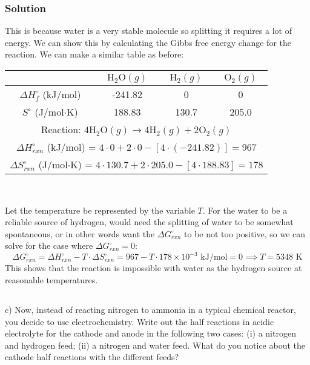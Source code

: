 \documentclass[12pt]{article}
\begin{document}
\subsubsection{Solution}
This is because water is a very stable molecule so splitting it requires a lot of energy. We can show this by calculating the Gibbs free energy change for the reaction.
We can make a similar table as before:
\begin{center}
\begin{tabular}{|c|c|c|c|}
\hline
    & $\mathrm{H_{2}O}(g)$ & $\mathrm{H_{2}}(g)$ & $\mathrm{O_{2}}(g)$ \\
\hline
$\Delta H_{f}^{\circ}$ (kJ/mol) & -241.82 & 0 & 0 \\
\hline
$S^{\circ}$ (J/mol$\cdot$K) & 188.83 & 130.7 & 205.0 \\
\hline
\multicolumn{4}{|c|}{Reaction: $4 \mathrm{H_{2}O}(g) \rightarrow 4 \mathrm{H_{2}}(g)+2\mathrm{O_{2}}(g)$} \\
\hline
\multicolumn{4}{|c|}{$\Delta H_{rxn}^{\circ}$ (kJ/mol) = $4 \cdot 0 + 2 \cdot 0 - [4 \cdot (-241.82)] = 967 $} \\
\hline
\multicolumn{4}{|c|}{$\Delta S_{rxn}^{\circ}$ (J/mol$\cdot$K) = $4 \cdot 130.7 + 2 \cdot 205.0 - [4 \cdot 188.83] = 178$} \\
\hline
\end{tabular}\\
\end{center}
Let the temperature be represented by the variable $T$. For the water to be a reliable source of hydrogen, would need the splitting of water to be somewhat spontaneous, or in other words want the $\Delta G_{rxn}^{\circ}$ to be not too positive, so we can solve for the case where $\Delta G_{rxn}^{\circ} = 0$:
\begin{equation}
\Delta G_{rxn}^{\circ} = \Delta H_{rxn}^{\circ} - T \cdot \Delta S_{rxn}^{\circ} = 967
    - T \cdot 178 \times 10^{-3} \text{ kJ/mol} =0 \implies T =  5348 \text{ K}
\end{equation}
This shows that the reaction is impossible with water as the hydrogen source at reasonable temperatures.
\subsection{}
c) Now, instead of reacting nitrogen to ammonia in a typical chemical reactor, you decide to use electrochemistry. Write out the half reactions in acidic electrolyte for the cathode and anode in the following two cases: (i) a nitrogen and hydrogen feed; (ii) a nitrogen and water feed. What do you notice about the cathode half reactions with the different feeds?\\
\end{document}
